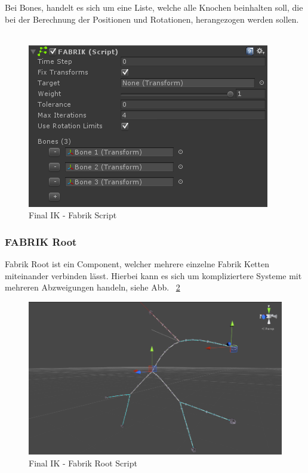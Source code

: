 \begin{itemize}
Bei Bones, handelt es sich um eine Liste, welche alle Knochen beinhalten soll, die bei der Berechnung der
Positionen und Rotationen, herangezogen werden sollen.
~\cite{FinalIK_FABRIK_2021}
\begin {figure}
    \centering
    \includegraphics[scale=0.8]{pics/finalik_fabrik_script}
    \caption{Final IK - Fabrik Script}
    \label{fig:finalIK_fabrik_script}
\end {figure}


\subsubsection{FABRIK Root}
Fabrik Root ist ein Component, welcher mehrere einzelne Fabrik Ketten miteinander verbinden lässt.
Hierbei kann es sich um kompliziertere Systeme mit mehreren Abzweigungen handeln, siehe Abb. ~\ref{fig:finalIK_fabrik_root_example}

\begin {figure}
    \centering
    \includegraphics[scale=0.8]{pics/finalik_fabrik_root_example}
    \caption{Final IK - Fabrik Root Script}
    \label{fig:finalIK_fabrik_root_example}
\end {figure}


\end{itemize}
